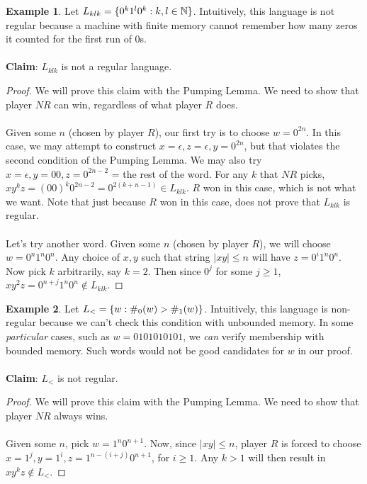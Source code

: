 \documentclass[]{article}
\DeclarePairedDelimiter{\set}{\lbrace}{\rbrace}
\theoremstyle{definition}
\newtheorem{ex}{Example}[section]
\newcommand{\lecture}[1]{\marginpar{{\footnotesize $\leftarrow$ \underline{#1}}}}
\begin{document}
        \begin{ex} \lecture{October 8, 2013}
          Let $L_{klk} = \set{ 0^k 1^l 0^k : k, l \in \mathbb{N}}$. Intuitively, this language is not regular because a machine with finite memory cannot remember how many zeros it counted for the first run of 0s.
          \\ \\
          \textbf{Claim}: $L_{klk}$ is not a regular language.

          \begin{proof}
            We will prove this claim with the Pumping Lemma. We need to show that player $NR$ can win, regardless of what player $R$ does.
            \\ \\
            Given some $n$ (chosen by player $R$), our first try is to choose $w = 0^{2n}$. In this case, we may attempt to construct $x = \epsilon, z = \epsilon, y = 0^{2n}$, but that violates the second condition of the Pumping Lemma. We may also try $x = \epsilon, y = 00, z = 0^{2n - 2}$ = the rest of the word. For any $k$ that $NR$ picks, $xy^kz = (00)^k 0^{2n - 2} = 0^{2(k + n - 1)} \in L_{klk}$. $R$ won in this case, which is not what we want. Note that just because $R$ won in this case, does not prove that $L_{klk}$ is regular.
            \\ \\
            Let's try another word. Given some $n$ (chosen by player $R$), we will choose $w = 0^n 1^n 0^n$. Any choice of $x, y$ such that string $|xy| \le n$ will have $z = 0^i 1^n 0^n$. Now pick $k$ arbitrarily, say $k = 2$. Then since $0^j$ for some $j \ge 1$, $xy^2z = 0^{n + j}1^n0^n \not \in L_{klk}$.
          \end{proof}
        \end{ex}

        \begin{ex}
          Let $L_< = \set{w : \#_0(w) > \#_1(w) }$. Intuitively, this language is non-regular because we can't check this condition with unbounded memory. In some \emph{particular} cases, such as $w = 0101010101$, we \emph{can} verify membership with bounded memory. Such words would not be good candidates for $w$ in our proof.
          \\ \\
          \textbf{Claim}: $L_<$ is not regular.

          \begin{proof}
            We will prove this claim with the Pumping Lemma. We need to show that player $NR$ always wins.
            \\ \\
            Given some $n$, pick $w = 1^n 0^{n + 1}$. Now, since $|xy| \le n$, player $R$ is forced to choose $x = 1^j, y = 1^i, z = 1^{n - (i + j)} 0^{n + 1}$, for $i \ge 1$. Any $k > 1$ will then result in $xy^kz \not \in L_<$.
          \end{proof}
        \end{ex}
\end{document}
